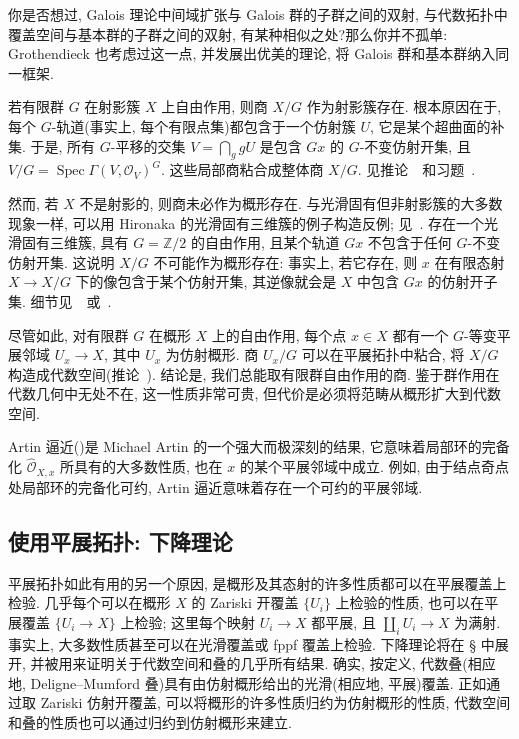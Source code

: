 \begin{example}[平展基本群]\label{src:1.5.7}
你是否想过, Galois 理论中间域扩张与 Galois 群的子群之间的双射, 与代数拓扑中覆盖空间与基本群的子群之间的双射, 有某种相似之处?那么你并不孤单: Grothendieck 也考虑过这一点, 并发展出优美的理论, 将 Galois 群和基本群纳入同一框架.
\end{example}
\begin{example}[有限群自由作用的商]\label{src:1.5.8}
若有限群 $G$ 在射影簇 $X$ 上自由作用, 则商 $X/G$ 作为射影簇存在. 根本原因在于, 每个 $G$-轨道(事实上, 每个有限点集)都包含于一个仿射簇 $U$, 它是某个超曲面的补集. 于是, 所有 $G$-平移的交集 $V=\bigcap_g gU$ 是包含 $Gx$ 的 $G$-不变仿射开集, 且 $V/G=\operatorname{Spec}\Gamma(V,\mathcal O_V)^G$. 这些局部商粘合成整体商 $X/G$. 见推论~~和习题~.

然而, 若 $X$ 不是射影的, 则商未必作为概形存在. 与光滑固有但非射影簇的大多数现象一样, 可以用 Hironaka 的光滑固有三维簇的例子构造反例; 见~\cite[附录 B, 例 3.4.1]{Har77}. 存在一个光滑固有三维簇, 具有 $G=\mathbb Z/2$ 的自由作用, 且某个轨道 $Gx$ 不包含于任何 $G$-不变仿射开集. 这说明 $X/G$ 不可能作为概形存在: 事实上, 若它存在, 则 $x$ 在有限态射 $X\to X/G$ 下的像包含于某个仿射开集, 其逆像就会是 $X$ 中包含 $Gx$ 的仿射开子集. 细节见~\cite[例 1.3]{Knu71}~或~\cite[例 5.3.2]{Ols16}.

尽管如此, 对有限群 $G$ 在概形 $X$ 上的自由作用, 每个点 $x\in X$ 都有一个 $G$-等变平展邻域 $U_x\to X$, 其中 $U_x$ 为仿射概形. 商 $U_x/G$ 可以在平展拓扑中粘合, 将 $X/G$ 构造成代数空间(推论~). 结论是, 我们总能取有限群自由作用的商. 鉴于群作用在代数几何中无处不在, 这一性质非常可贵, 但代价是必须将范畴从概形扩大到代数空间.
\end{example}
\begin{example}[Artin 逼近]\label{src:1.5.9}
Artin 逼近()是 Michael Artin 的一个强大而极深刻的结果, 它意味着局部环的完备化 $\widehat{\mathcal O}_{X,x}$ 所具有的大多数性质, 也在 $x$ 的某个平展邻域中成立. 例如, 由于结点奇点处局部环的完备化可约, Artin 逼近意味着存在一个可约的平展邻域.
\end{example}

\subsection{使用平展拓扑: 下降理论}\label{src:1.5.3-subsection}
平展拓扑如此有用的另一个原因, 是概形及其态射的许多性质都可以在平展覆盖上检验. 几乎每个可以在概形 $X$ 的 Zariski 开覆盖 $\{U_i\}$ 上检验的性质, 也可以在平展覆盖 $\{U_i\to X\}$ 上检验; 这里每个映射 $U_i\to X$ 都平展, 且 $\coprod_i U_i\to X$ 为满射. 事实上, 大多数性质甚至可以在光滑覆盖或 fppf 覆盖上检验. 下降理论将在 \S{} 中展开, 并被用来证明关于代数空间和叠的几乎所有结果. 确实, 按定义, 代数叠(相应地, Deligne--Mumford 叠)具有由仿射概形给出的光滑(相应地, 平展)覆盖. 正如通过取 Zariski 仿射开覆盖, 可以将概形的许多性质归约为仿射概形的性质, 代数空间和叠的性质也可以通过归约到仿射概形来建立.

